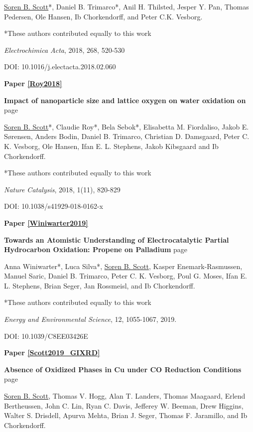 		\underline{Soren B. Scott}*, Daniel B. Trimarco*, Anil H. Thilsted, Jesper Y. Pan, Thomas Pedersen, Ole Hansen, Ib Chorkendorff, and Peter C.K. Vesborg. 
		
		*These authors contributed equally to this work
		
		\textit{Electrochimica Acta}, 2018, 268, 520-530
		
		DOI: 10.1016/j.electacta.2018.02.060


\vspace{5mm}
\noindent\textbf{Paper \ref{Roy2018}} 

\textbf{Impact of nanoparticle size and lattice oxygen on water oxidation on } \hfill page~\pageref{Roy2018}

	\underline{Soren B. Scott}*, Claudie Roy*, Bela Sebok*, Elisabetta M. Fiordaliso, Jakob E. Sørensen, Anders Bodin, Daniel B. Trimarco, Christian D. Damsgaard, Peter C. K. Vesborg, Ole Hansen, Ifan E. L. Stephens, Jakob Kibsgaard and Ib Chorkendorff. 

	*These authors contributed equally to this work
	
	\textit{Nature Catalysis}, 2018, 1(11), 820-829 
	
	DOI: 10.1038/s41929-018-0162-x



\vspace{5mm}
\noindent\textbf{Paper \ref{Winiwarter2019}} 

\textbf{Towards an Atomistic Understanding of Electrocatalytic Partial Hydrocarbon Oxidation: Propene on Palladium} \hfill page~\pageref{Winiwarter2019}

Anna Winiwarter*, Luca Silva*, \underline{Soren B. Scott}, Kasper Enemark-Rasmussen, Manuel Saric, Daniel B. Trimarco, Peter C. K. Vesborg, Poul G. Moses, Ifan E. L. Stephens, Brian Seger, Jan Rossmeisl, and Ib Chorkendorff.

*These authors contributed equally to this work

\textit{Energy and Environmental Science}, 12, 1055-1067, 2019.

DOI:  10.1039/C8EE03426E


\vspace{5mm}
\noindent\textbf{Paper \ref{Scott2019_GIXRD}} 

\textbf{Absence of Oxidized Phases in Cu under CO Reduction Conditions} \hfill page~\pageref{Scott2019_GIXRD}

\underline{Soren B. Scott}, Thomas V. Hogg, Alan T. Landers, Thomas Maagaard, Erlend Bertheussen, John C. Lin, Ryan C. Davis, Jefferey W. Beeman, Drew Higgins, Walter S. Drisdell, Apurva Mehta, Brian J. Seger, Thomas F. Jaramillo, and Ib Chorkendorff.

